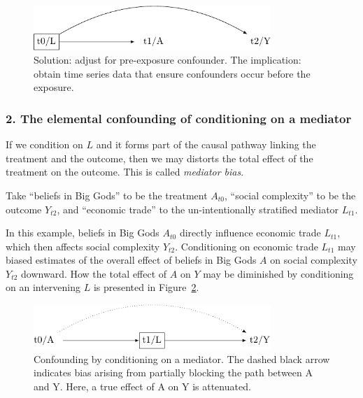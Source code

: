 \documentclass[
  singlecolumn,
  9pt]{article}
\begin{document}
\begin{figure}

{\centering \includegraphics[width=0.8\textwidth,height=\textheight]{causal-dags_files/figure-pdf/fig-dag-common-cause-solution-1.pdf}

}

\caption{\label{fig-dag-common-cause-solution}Solution: adjust for
pre-exposure confounder. The implication: obtain time series data that
ensure confounders occur before the exposure.}

\end{figure}

\subsubsection{2. The elemental confounding of conditioning on a
mediator}\label{the-elemental-confounding-of-conditioning-on-a-mediator}

If we condition on \(L\) and it forms part of the causal pathway linking
the treatment and the outcome, then we may distorts the total effect of
the treatment on the outcome. This is called \emph{mediator bias}.

Take ``beliefs in Big Gods'' to be the treatment \(A_{t0}\), ``social
complexity'' to be the outcome \(Y_{t2}\), and ``economic trade'' to the
un-intentionally stratified mediator \(L_{t1}\).

In this example, beliefs in Big Gods \(A_{t0}\) directly influence
economic trade \(L_{t1}\), which then affects social complexity
\(Y_{t2}\). Conditioning on economic trade \(L_{t1}\) may biased
estimates of the overall effect of beliefs in Big Gods \(A\) on social
complexity \(Y_{t2}\) downward. How the total effect of \(A\) on \(Y\)
may be diminished by conditioning on an intervening \(L\) is presented
in Figure~\ref{fig-dag-mediator}.

\begin{figure}

{\centering \includegraphics[width=0.8\textwidth,height=\textheight]{causal-dags_files/figure-pdf/fig-dag-mediator-1.pdf}

}

\caption{\label{fig-dag-mediator}Confounding by conditioning on a
mediator. The dashed black arrow indicates bias arising from partially
blocking the path between A and Y. Here, a true effect of A on Y is
attenuated.}

\end{figure}
\end{document}
